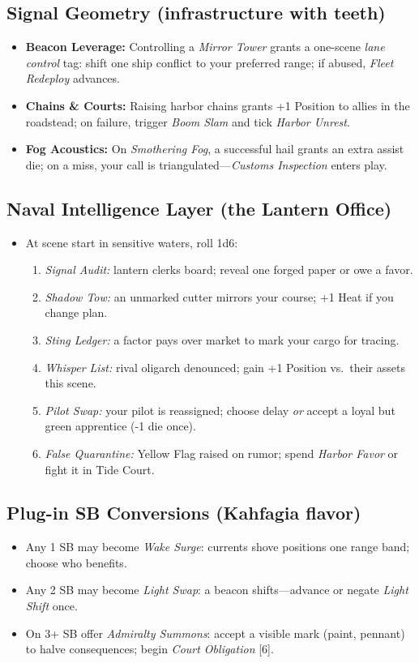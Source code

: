 \subsection*{Signal Geometry (infrastructure with teeth)}
\begin{itemize}
  \item \textbf{Beacon Leverage:} Controlling a \emph{Mirror Tower} grants a one-scene \emph{lane control} tag: shift one ship conflict to your preferred range; if abused, \emph{Fleet Redeploy} advances.
  \item \textbf{Chains \& Courts:} Raising harbor chains grants +1 Position to allies in the roadstead; on failure, trigger \emph{Boom Slam} and tick \emph{Harbor Unrest}.
  \item \textbf{Fog Acoustics:} On \emph{Smothering Fog}, a successful hail grants an extra assist die; on a miss, your call is triangulated—\emph{Customs Inspection} enters play.
\end{itemize}

\subsection*{Naval Intelligence Layer (the Lantern Office)}
\begin{itemize}
  \item At scene start in sensitive waters, roll 1d6:
  \begin{enumerate}
    \item \emph{Signal Audit:} lantern clerks board; reveal one forged paper or owe a favor.
    \item \emph{Shadow Tow:} an unmarked cutter mirrors your course; +1 Heat if you change plan.
    \item \emph{Sting Ledger:} a factor pays over market to mark your cargo for tracing.
    \item \emph{Whisper List:} rival oligarch denounced; gain +1 Position vs.\ their assets this scene.
    \item \emph{Pilot Swap:} your pilot is reassigned; choose delay \emph{or} accept a loyal but green apprentice (-1 die once).
    \item \emph{False Quarantine:} Yellow Flag raised on rumor; spend \emph{Harbor Favor} or fight it in Tide Court.
  \end{enumerate}
\end{itemize}

\subsection*{Plug-in SB Conversions (Kahfagia flavor)}
\begin{itemize}
  \item Any 1 SB may become \emph{Wake Surge}: currents shove positions one range band; choose who benefits.
  \item Any 2 SB may become \emph{Light Swap}: a beacon shifts—advance or negate \emph{Light Shift} once.
  \item On 3+ SB offer \emph{Admiralty Summons}: accept a visible mark (paint, pennant) to halve consequences; begin \emph{Court Obligation} [6].
\end{itemize}